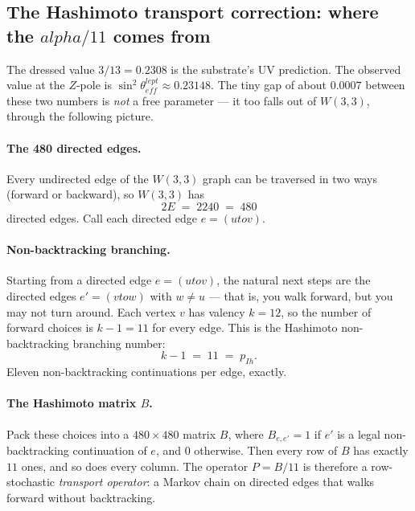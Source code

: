 \documentclass[11pt]{article}
\def\mathrm#1{#1}%
\def\textbf#1{#1}%
\def\alpha{alpha}%
\def\cdot{ }%
\def\to{ to }%
\begin{document}
\subsection*{The Hashimoto transport correction: where the $\alpha/11$ comes from}

The dressed value $3/13 = 0.2308$ is the substrate's UV prediction.  The
observed value at the $Z$-pole is $\sin^2\theta_{\mathrm{eff}}^{\mathrm{lept}}
\approx 0.23148$.  The tiny gap of about $0.0007$ between these two
numbers is \emph{not} a free parameter --- it too falls out of $W(3,3)$,
through the following picture.

\paragraph{The 480 directed edges.}
Every undirected edge of the $W(3,3)$ graph can be traversed in two ways
(forward or backward), so $W(3,3)$ has
\[
2 E \;=\; 2 \cdot 240 \;=\; 480
\]
directed edges.  Call each directed edge $e = (u \to v)$.

\paragraph{Non-backtracking branching.}
Starting from a directed edge $e = (u \to v)$, the natural next steps
are the directed edges $e' = (v \to w)$ with $w \ne u$ --- that is, you
walk forward, but you may not turn around.  Each vertex $v$ has valency
$k = 12$, so the number of forward choices is $k - 1 = 11$ for every
edge.  This is the \textbf{Hashimoto non-backtracking branching number}:
\[
\boxed{\;k - 1 \;=\; 11 \;=\; p_{\mathrm{Ih}}.\;}
\]
\textbf{Eleven} non-backtracking continuations per edge, exactly.

\paragraph{The Hashimoto matrix $B$.}
Pack these choices into a $480 \times 480$ matrix $B$, where $B_{e,e'} = 1$
if $e'$ is a legal non-backtracking continuation of $e$, and $0$
otherwise.  Then every row of $B$ has exactly $11$ ones, and so does
every column.  The operator $P = B / 11$ is therefore a row-stochastic
\emph{transport operator}: a Markov chain on directed edges that walks
forward without backtracking.
\end{document}
